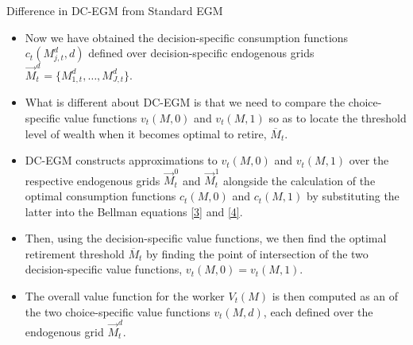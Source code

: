 \documentclass[aspectratio=169]{beamer}
\newcommand{\highlight}[1]{{\color{blue}{#1}}}
\begin{document}
\begin{frame}{Difference in DC-EGM from Standard EGM}\small
	\begin{itemize}
		\item Now we have obtained the decision-specific consumption functions $c_t(M_{j,t}^d, d)$ defined over decision-specific endogenous grids $\overrightarrow{M}_t^d = \{M_{1,t}^d, \ldots, M_{J,t}^d\}$.
		\item What is different about DC-EGM is that we need to compare the choice-specific value functions $v_t(M,0)$ and $v_t(M, 1)$ so as to locate the threshold level of wealth when it becomes optimal to retire, $\overline{M}_t$.
		\item DC-EGM constructs approximations to $v_t(M,0)$ and $v_t(M, 1)$ over the respective endogenous grids $\overrightarrow{M}_t^0$ and $\overrightarrow{M}_t^1$ alongside the calculation of the optimal consumption functions $c_t(M, 0)$ and $c_t(M, 1)$ by substituting the latter into the Bellman equations \ref{3} and \ref{4}. 
		\item Then, using the decision-specific value functions, we then find the optimal retirement threshold $\overline{M}_t$ by finding the point of intersection of the two decision-specific value functions, $v_t(M,0) = v_t(M, 1)$.
		\item The overall value function for the worker $V_t(M)$ is then computed as an \highlight{upper envelope} of the two choice-specific value functions $v_t(M, d)$, each defined over the endogenous grid $\overrightarrow{M}_t^d$.
	\end{itemize}
\end{frame}
\end{document}
